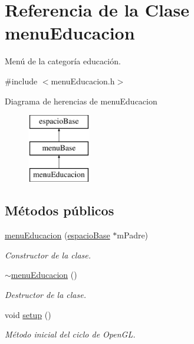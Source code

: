 \hypertarget{classmenu_educacion}{}\section{Referencia de la Clase menu\+Educacion}
\label{classmenu_educacion}


Menú de la categoría educación.  




{\ttfamily \#include $<$menu\+Educacion.\+h$>$}

Diagrama de herencias de menu\+Educacion\begin{figure}[H]
\begin{center}
\leavevmode
\includegraphics[height=3.000000cm]{classmenu_educacion}
\end{center}
\end{figure}
\subsection*{Métodos públicos}
\begin{DoxyCompactItemize}
\item 
\hyperlink{classmenu_educacion_a2fba0b83189f92ad20f6fc2526c5ba6f}{menu\+Educacion} (\hyperlink{classespacio_base}{espacio\+Base} $\ast$m\+Padre)
\begin{DoxyCompactList}\small\item\em Constructor de la clase. \end{DoxyCompactList}\item 
\hyperlink{classmenu_educacion_a5613fcc80f443081cadc8a1bfb1c8b97}{$\sim$menu\+Educacion} ()
\begin{DoxyCompactList}\small\item\em Destructor de la clase. \end{DoxyCompactList}\item 
void \hyperlink{classmenu_educacion_a782815ae0152a27aca5d33885f607e81}{setup} ()
\begin{DoxyCompactList}\small\item\em Método inicial del ciclo de Open\+G\+L. \end{DoxyCompactList}\end{DoxyCompactItemize}
